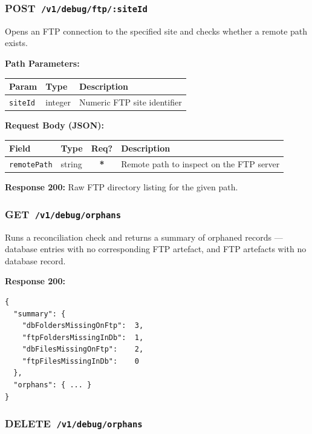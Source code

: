 \documentclass[12pt,a4paper]{article}
\newcommand{\httpget}[1]{%
  \colorbox{getcolor!20}{\textcolor{getcolor}{\textbf{\small GET}}}~\texttt{#1}%
}
\newcommand{\httppost}[1]{%
  \colorbox{postcolor!20}{\textcolor{postcolor}{\textbf{\small POST}}}~\texttt{#1}%
}
\newcommand{\httpdelete}[1]{%
  \colorbox{deletecolor!20}{\textcolor{deletecolor}{\textbf{\small DELETE}}}~\texttt{#1}%
}
\newcommand{\required}{\textcolor{danger}{\textbf{*}}}
\begin{document}
\subsubsection{\httppost{/v1/debug/ftp/:siteId}}

Opens an FTP connection to the specified site and checks whether a remote path exists.

\textbf{Path Parameters:}

\begin{tabularx}{\linewidth}{llX}
\toprule
\textbf{Param} & \textbf{Type} & \textbf{Description} \\
\midrule
\texttt{siteId} & integer & Numeric FTP site identifier \\
\bottomrule
\end{tabularx}

\textbf{Request Body (JSON):}

\begin{tabularx}{\linewidth}{llcX}
\toprule
\textbf{Field} & \textbf{Type} & \textbf{Req?} & \textbf{Description} \\
\midrule
\texttt{remotePath} & string & \required & Remote path to inspect on the FTP server \\
\bottomrule
\end{tabularx}

\textbf{Response 200:} Raw FTP directory listing for the given path.

\vspace{0.5em}
\subsubsection{\httpget{/v1/debug/orphans}}

Runs a reconciliation check and returns a summary of orphaned records — database entries with no corresponding FTP artefact, and FTP artefacts with no database record.

\textbf{Response 200:}
\begin{lstlisting}
{
  "summary": {
    "dbFoldersMissingOnFtp":  3,
    "ftpFoldersMissingInDb":  1,
    "dbFilesMissingOnFtp":    2,
    "ftpFilesMissingInDb":    0
  },
  "orphans": { ... }
}
\end{lstlisting}

\vspace{0.5em}
\subsubsection{\httpdelete{/v1/debug/orphans}}
\end{document}

